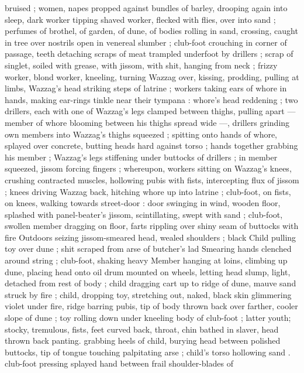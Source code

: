 bruised ; women, napes propped against bundles of barley, drooping 
again into sleep, dark worker tipping shaved worker, flecked with 
flies, over into sand ; perfumes of brothel, of garden, of dune, of 
bodies rolling in sand, crossing, caught in tree over nostrils open in 
venereal slumber ; club-foot crouching in corner of passage, teeth 
detaching scraps of meat trampled underfoot by drillers ; scrap of 
singlet, soiled with grease, with jissom, with shit, hanging from neck 
; frizzy worker, blond worker, kneeling, turning Wazzag over, kissing, 
prodding, pulling at limbs, Wazzag's head striking steps of latrine ; 
workers taking ears of whore in hands, making ear-rings tinkle near 
their tympana : whore's head reddening ; two drillers, each with one 
of Wazzag's legs clamped between thighs, pulling apart --- member 
of whore blooming between his thighs spread wide ---, drillers 
grinding own members into Wazzag's thighs squeezed ; spitting onto 
hands of whore, splayed over concrete, butting heads hard against 
torso ; hands together grabbing his member ; Wazzag's legs 
stiffening under buttocks of drillers ; in member squeezed, jissom 
forcing fingers ; whereupon, workers sitting on Wazzag's knees, 
crushing contracted muscles, hollowing pubis with fists, intercepting 
flux of jissom ; knees driving Wazzag back, hitching whore up into 
latrine ; club-foot, on fists, on knees, walking towards street-door : 
door swinging in wind, wooden floor, splashed with panel-beater's 
jissom, scintillating, swept with sand ; club-foot, swollen member 
dragging on floor, farts rippling over shiny seam of buttocks with fire 
Outdoors seizing jissom-smeared head, wealed shoulders ; black 
Child pulling toy over dune ; shit scraped from arse of butcher's lad 
Smearing hands clenched around string ; club-foot, shaking heavy 
Member hanging at loins, climbing up dune, placing head onto oil 
drum mounted on wheels, letting head slump, light, detached from 
rest of body ; child dragging cart up to ridge of dune, mauve sand 
struck by fire ; child, dropping toy, stretching out, naked, black skin 
glimmering violet under fire, ridge barring pubis, tip of body thrown 
back over farther, cooler slope of dune ; toy rolling down under 
kneeling body of club-foot ; latter youth; stocky, tremulous, fists, feet 
curved back, throat, chin bathed in slaver, head thrown back panting. 
grabbing heels of child, burying head between polished buttocks, tip 
of tongue touching palpitating arse ; child's torso hollowing sand . 
club-foot pressing splayed hand between frail shoulder-blades of 
